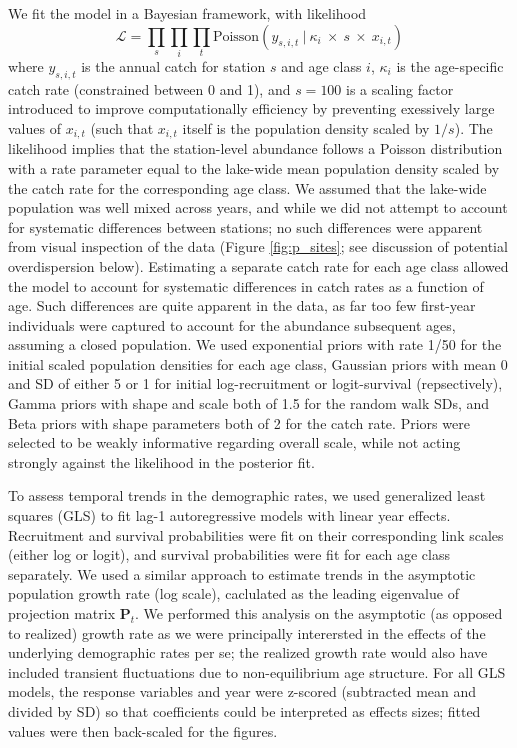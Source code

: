 We fit the model in a Bayesian framework, with likelihood
%
\begin{equation} \label{eq:likelihood}
\mathcal{L} = 
\displaystyle\prod_{s}
\displaystyle\prod_{i}
\displaystyle\prod_{t}
\text{Poisson}
    \left(
        y_{s,i,t}~|~\kappa_i~\times~s~\times~x_{i,t}
    \right)
\end{equation}
%
where $y_{s,i,t}$ is the annual catch for station $s$ and age class $i$,
$\kappa_i$ is the age-specific catch rate (constrained between 0 and 1),
and $s=100$ is a scaling factor introduced to improve computationally efficiency
by preventing exessively large values of $x_{i,t}$ 
(such that $x_{i,t}$ itself is the population density scaled by $1/s$).
The likelihood implies that the station-level abundance follows a Poisson distribution
with a rate parameter equal to the lake-wide mean population density 
scaled by the catch rate for the corresponding age class.
We assumed that the lake-wide population was well mixed across years,
and while we did not attempt to account for systematic differences between stations;
no such differences were apparent from visual inspection of the data 
(Figure  \ref{fig:p_sites}; see discussion of potential overdispersion below).
Estimating a separate catch rate for each age class allowed the model to account
for systematic differences in catch rates as a function of age.
Such differences are quite apparent in the data, 
as far too few first-year individuals were captured to account for the abundance subsequent
ages, assuming a closed population. 
We used exponential priors with rate 1/50 for the initial scaled population densities for
each age class, 
Gaussian priors with mean 0 and SD of either 5 or 1 for 
initial log-recruitment or logit-survival (repsectively), 
Gamma priors with shape and scale both of 1.5 for the random walk SDs,
and Beta priors with shape parameters both of 2 for the catch rate.
Priors were selected to be weakly informative regarding overall scale, 
while not acting strongly against the likelihood in the posterior fit.

To assess temporal trends in the demographic rates, 
we used generalized least squares  (GLS) to fit lag-1 autoregressive models
with linear year effects.
Recruitment and survival probabilities were fit on their corresponding link scales 
(either log or logit),
and survival probabilities were fit for each age class separately.
We used a similar approach to estimate trends in the asymptotic population growth rate
(log scale), 
caclulated as the leading eigenvalue of projection matrix $\mathbf{P}_{t}$.
We performed this analysis on the asymptotic (as opposed to realized) growth rate 
as we were principally interersted in the effects 
of the underlying demographic rates per se; 
the realized growth rate would also have included transient fluctuations due to
non-equilibrium age structure.
For all GLS models, the response variables and year were z-scored 
(subtracted mean and divided by SD) so that coefficients
could be interpreted as effects sizes;
fitted values were then back-scaled for the figures.

